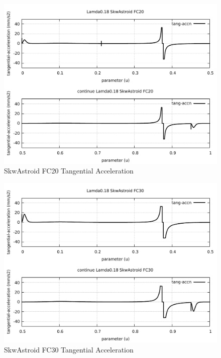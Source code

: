 \begin{figure}
	\caption     {SkwAstroid FC20 Tangential Acceleration}
	\label{22-img-SkwAstroid-FC20-Tangential-Acceleration.pdf}
	\includegraphics[width=1.00\textwidth]{Chap4/appendix/app-SkwAstroid/plots/22-img-SkwAstroid-FC20-Tangential-Acceleration.pdf}
\end{figure}

\clearpage
\pagebreak

\begin{figure}
	\caption     {SkwAstroid FC30 Tangential Acceleration}
	\label{23-img-SkwAstroid-FC30-Tangential-Acceleration.pdf}
	\includegraphics[width=1.00\textwidth]{Chap4/appendix/app-SkwAstroid/plots/23-img-SkwAstroid-FC30-Tangential-Acceleration.pdf}
\end{figure}


